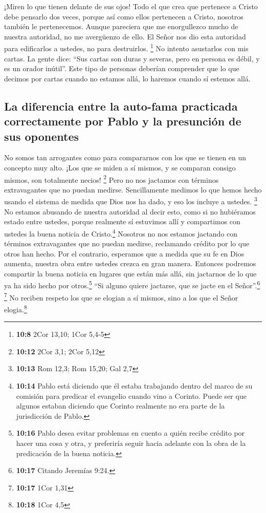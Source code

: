  ¡Miren lo que tienen delante de sus ojos! Todo el que
crea que pertenece a Cristo debe pensarlo dos veces, porque así como
ellos pertenecen a Cristo, nosotros también le pertenecemos.
 Aunque pareciera que me enorgullezco mucho de nuestra
autoridad, no me avergüenzo de ello. El Señor nos dio esta autoridad
para edificarlos a ustedes, no para destruirlos. \footnote{\textbf{10:8}
  2Cor 13,10; 1Cor 5,4-5}  No intento asustarlos con mis
cartas.  La gente dice: ``Sus cartas son duras y severas,
pero en persona es débil, y es un orador inútil''.  Este
tipo de personas deberían comprender que lo que decimos por cartas
cuando no estamos allá, lo haremos cuando sí estemos allá.

\hypertarget{la-diferencia-entre-la-auto-fama-practicada-correctamente-por-pablo-y-la-presunciuxf3n-de-sus-oponentes}{%
\subsection{La diferencia entre la auto-fama practicada correctamente
por Pablo y la presunción de sus
oponentes}\label{la-diferencia-entre-la-auto-fama-practicada-correctamente-por-pablo-y-la-presunciuxf3n-de-sus-oponentes}}

 No somos tan arrogantes como para compararnos con los
que se tienen en un concepto muy alto. ¡Los que se miden a sí mismos, y
se comparan consigo mismos, son totalmente necios! \footnote{\textbf{10:12}
  2Cor 3,1; 2Cor 5,12}  Pero no nos jactamos con términos
extravagantes que no puedan medirse. Sencillamente medimos lo que hemos
hecho usando el sistema de medida que Dios nos ha dado, y eso los
incluye a ustedes. \footnote{\textbf{10:13} Rom 12,3; Rom 15,20; Gal 2,7}
 No estamos abusando de nuestra autoridad al decir esto,
como si no hubiéramos estado entre ustedes, porque realmente sí
estuvimos allí y compartimos con ustedes la buena noticia de
Cristo.\footnote{\textbf{10:14} Pablo está diciendo que él estaba
  trabajando dentro del marco de su comisión para predicar el evangelio
  cuando vino a Corinto. Puede ser que algunos estaban diciendo que
  Corinto realmente no era parte de la jurisdicción de Pablo.}
 Nosotros no nos estamos jactando con términos
extravagantes que no puedan medirse, reclamando crédito por lo que otros
han hecho. Por el contrario, esperamos que a medida que su fe en Dios
aumenta, nuestra obra entre ustedes crezca en gran manera.
 Entonces podremos compartir la buena noticia en lugares
que están más allá, sin jactarnos de lo que ya ha sido hecho por
otros.\footnote{\textbf{10:16} Pablo desea evitar problemas en cuento a
  quién recibe crédito por hacer una cosa y otra, y preferiría seguir
  hacia adelante con la obra de la predicación de la buena noticia.}
 ``Si alguno quiere jactarse, que se jacte en el
Señor''.\footnote{\textbf{10:17} Citando Jeremías 9:24.} \footnote{\textbf{10:17}
  1Cor 1,31}  No reciben respeto los que se elogian a sí
mismos, sino a los que el Señor elogia.\footnote{\textbf{10:18} 1Cor 4,5}

